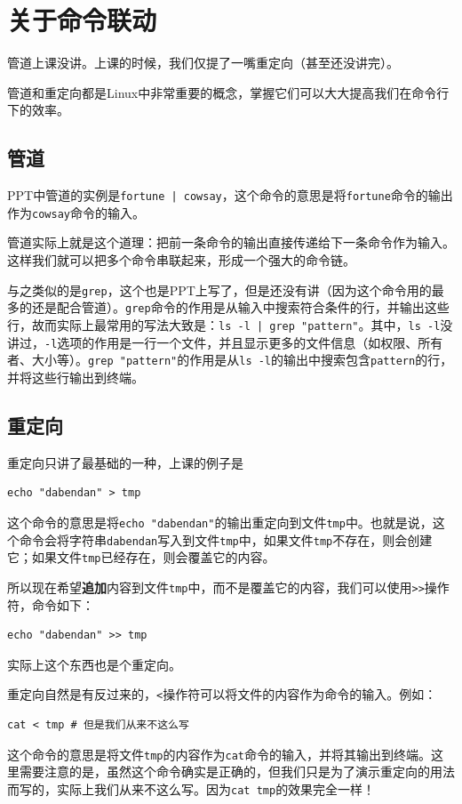 \documentclass[12pt]{ctexart}
\begin{document}
\section{关于命令联动}

管道上课没讲。上课的时候，我们仅提了一嘴重定向（甚至还没讲完）。

管道和重定向都是Linux中非常重要的概念，掌握它们可以大大提高我们在命令行下的效率。

\subsection{管道}

PPT中管道的实例是\texttt{fortune | cowsay}，这个命令的意思是将\texttt{fortune}命令的输出作为\texttt{cowsay}命令的输入。

管道实际上就是这个道理：把前一条命令的输出直接传递给下一条命令作为输入。这样我们就可以把多个命令串联起来，形成一个强大的命令链。

与之类似的是\texttt{grep}，这个也是PPT上写了，但是还没有讲（因为这个命令用的最多的还是配合管道）。\texttt{grep}命令的作用是从输入中搜索符合条件的行，并输出这些行，故而实际上最常用的写法大致是：\texttt{ls -l | grep "pattern"}。其中，\texttt{ls -l}没讲过，\texttt{-l}选项的作用是一行一个文件，并且显示更多的文件信息（如权限、所有者、大小等）。\texttt{grep "pattern"}的作用是从\texttt{ls -l}的输出中搜索包含\texttt{pattern}的行，并将这些行输出到终端。

\subsection{重定向}

重定向只讲了最基础的一种，上课的例子是
\begin{verbatim}
echo "dabendan" > tmp
\end{verbatim}
这个命令的意思是将\texttt{echo "dabendan"}的输出重定向到文件\texttt{tmp}中。也就是说，这个命令会将字符串\texttt{dabendan}写入到文件\texttt{tmp}中，如果文件\texttt{tmp}不存在，则会创建它；如果文件\texttt{tmp}已经存在，则会覆盖它的内容。

所以现在希望\textbf{追加}内容到文件\texttt{tmp}中，而不是覆盖它的内容，我们可以使用\texttt{>>}操作符，命令如下：
\begin{verbatim}
echo "dabendan" >> tmp
\end{verbatim}
实际上这个东西也是个重定向。

重定向自然是有反过来的，\texttt{<}操作符可以将文件的内容作为命令的输入。例如：
\begin{verbatim}
cat < tmp # 但是我们从来不这么写
\end{verbatim}
这个命令的意思是将文件\texttt{tmp}的内容作为\texttt{cat}命令的输入，并将其输出到终端。这里需要注意的是，虽然这个命令确实是正确的，但我们只是为了演示重定向的用法而写的，实际上我们从来不这么写。因为\texttt{cat tmp}的效果完全一样！
\end{document}
